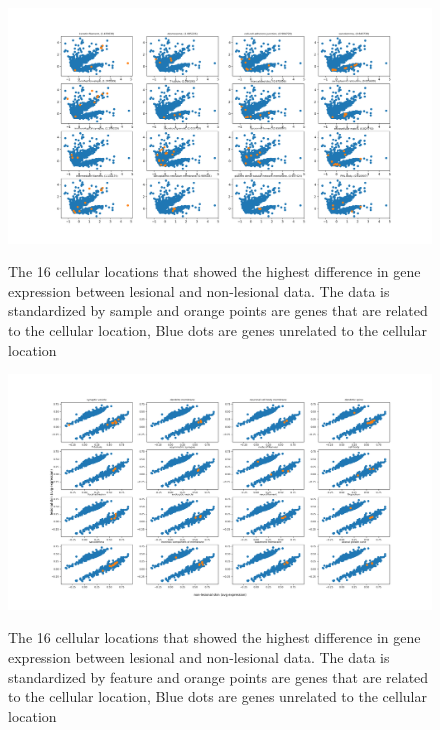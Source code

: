 \documentclass[10pt,a4paper]{article}
\begin{document}
	\begin{figure}[H]
		\includegraphics[width=1\textwidth]{Sign_Organelles_Psoriasis.png}
		\label{fig:CellularScaledBySample}
		\caption{The 16 cellular locations that showed the highest difference in gene expression between lesional and non-lesional data. The data is standardized by sample and orange points are genes that are related to the cellular location, Blue dots are genes unrelated to the cellular location}
	\end{figure}

	\begin{figure}[H]
		\includegraphics[width=1\textwidth]{Sign_Organelles_Psoriasis_Scaled.png}
		\label{fig:CellularScaledByFeature1}
		\caption{The 16 cellular locations that showed the highest difference in gene expression between lesional and non-lesional data. The data is standardized by feature and orange points are genes that are related to the cellular location, Blue dots are genes unrelated to the cellular location}
	\end{figure}
\end{document}
